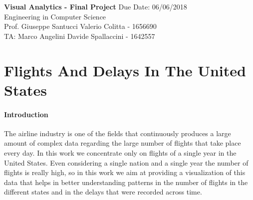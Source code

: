 \documentclass[a4paper, 12pt]{article}
\begin{document}
\noindent
\large\textbf{Visual Analytics - Final Project} \normalsize \hfill Due Date: 06/06/2018 \\
\normalsize Engineering in Computer Science   \\
Prof. Giuseppe Santucci \hfill Valerio Colitta - 1656690 \\
TA: Marco Angelini \hfill Davide Spallaccini - 1642557

\section*{Flights And Delays In The United States}

\paragraph{Introduction}
The airline industry is one of the fields that continuously produces a large amount of complex data
regarding the large number of flights that take place every day. In this work we concentrate only on
flights of a single year in the United States. Even considering a single nation and a single year the
number of flights is really high, so in this work we aim at providing a visualization of this data that
helps in better understanding patterns in the number of flights in the different states and in the 
delays that were recorded across time.
\end{document}
